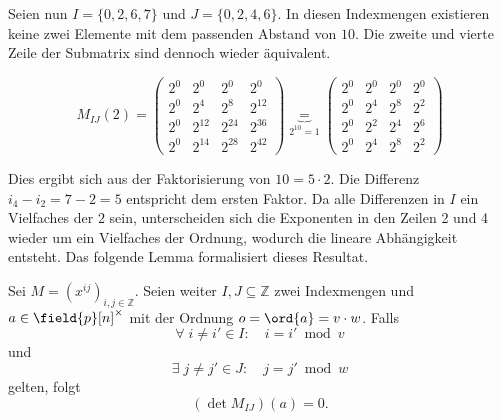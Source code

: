 Seien nun $I=\{0,2,6,7\}$ und $J=\{0,2,4,6\}$. In diesen Indexmengen existieren keine zwei Elemente mit dem passenden Abstand von $10$. Die zweite und vierte Zeile der Submatrix sind dennoch wieder äquivalent.

\begin{equation*}
    M_{IJ}(2) = \begin{pmatrix}
        2^{0} & 2^{0} & 2^{0} & 2^{0} \\
        2^{0} & 2^{4} & 2^{8} & 2^{12} \\
        2^{0} & 2^{12} & 2^{24} & 2^{36} \\
        2^{0} & 2^{14} & 2^{28} & 2^{42} 
    \end{pmatrix} \underbrace{=}_{2^{10}=1} \begin{pmatrix}
        2^{0} & 2^{0} & 2^{0} & 2^{0} \\
        2^{0} & 2^{4} & 2^{8} & 2^{2} \\
        2^{0} & 2^{2} & 2^{4} & 2^{6} \\
        2^{0} & 2^{4} & 2^{8} & 2^{2} 
    \end{pmatrix}
\end{equation*}

Dies ergibt sich aus der Faktorisierung von $10 = 5 \cdot 2$. Die Differenz ${i_4 - i_2 = 7 - 2 = 5}$ entspricht dem ersten Faktor. Da alle Differenzen in $I$ ein Vielfaches der $2$ sein, unterscheiden sich die Exponenten in den Zeilen 2 und 4 wieder um ein Vielfaches der Ordnung, wodurch die lineare Abhängigkeit entsteht. Das folgende Lemma formalisiert dieses Resultat.

\begin{lemma} \label{lemma:equal-columns}
    Sei $M = \left( x^{ij} \right)_{i,j \in \mathbb{Z}}$. Seien weiter $I,J \subseteq \mathbb{Z}$ zwei Indexmengen und $a \in \field{p}[n]^\times$ mit der Ordnung $o = \ord{a} = v\cdot w$. Falls
    \begin{equation} \label{equation:all-equal}
        \forall \; i \neq i' \in I: \quad i = i' \bmod v
    \end{equation}
    und
    \begin{equation} \label{equation:two-equal}
        \exists \; j \neq j' \in J: \quad j = j' \bmod w
    \end{equation}
    gelten, folgt
    \begin{equation*}
        (\det M_{IJ})(a) = 0.
    \end{equation*}
\end{lemma}

